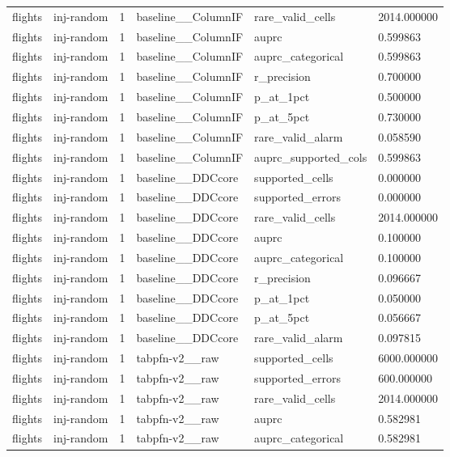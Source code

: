 \begin{tabular}{llllll}
flights & inj-random & 1 & baseline\_\_ColumnIF & rare\_valid\_cells & 2014.000000 \\
flights & inj-random & 1 & baseline\_\_ColumnIF & auprc & 0.599863 \\
flights & inj-random & 1 & baseline\_\_ColumnIF & auprc\_categorical & 0.599863 \\
flights & inj-random & 1 & baseline\_\_ColumnIF & r\_precision & 0.700000 \\
flights & inj-random & 1 & baseline\_\_ColumnIF & p\_at\_1pct & 0.500000 \\
flights & inj-random & 1 & baseline\_\_ColumnIF & p\_at\_5pct & 0.730000 \\
flights & inj-random & 1 & baseline\_\_ColumnIF & rare\_valid\_alarm & 0.058590 \\
flights & inj-random & 1 & baseline\_\_ColumnIF & auprc\_supported\_cols & 0.599863 \\
flights & inj-random & 1 & baseline\_\_DDCcore & supported\_cells & 0.000000 \\
flights & inj-random & 1 & baseline\_\_DDCcore & supported\_errors & 0.000000 \\
flights & inj-random & 1 & baseline\_\_DDCcore & rare\_valid\_cells & 2014.000000 \\
flights & inj-random & 1 & baseline\_\_DDCcore & auprc & 0.100000 \\
flights & inj-random & 1 & baseline\_\_DDCcore & auprc\_categorical & 0.100000 \\
flights & inj-random & 1 & baseline\_\_DDCcore & r\_precision & 0.096667 \\
flights & inj-random & 1 & baseline\_\_DDCcore & p\_at\_1pct & 0.050000 \\
flights & inj-random & 1 & baseline\_\_DDCcore & p\_at\_5pct & 0.056667 \\
flights & inj-random & 1 & baseline\_\_DDCcore & rare\_valid\_alarm & 0.097815 \\
flights & inj-random & 1 & tabpfn-v2\_\_raw & supported\_cells & 6000.000000 \\
flights & inj-random & 1 & tabpfn-v2\_\_raw & supported\_errors & 600.000000 \\
flights & inj-random & 1 & tabpfn-v2\_\_raw & rare\_valid\_cells & 2014.000000 \\
flights & inj-random & 1 & tabpfn-v2\_\_raw & auprc & 0.582981 \\
flights & inj-random & 1 & tabpfn-v2\_\_raw & auprc\_categorical & 0.582981 \\

\end{tabular}
